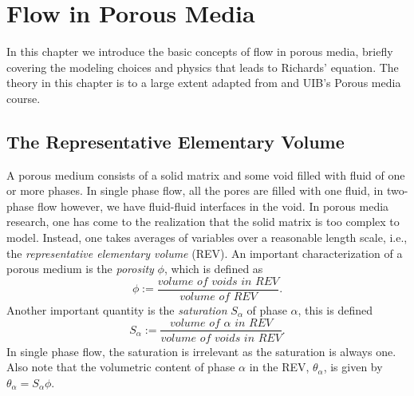 \documentclass[../Main/main.tex]{subfiles}
\begin{document}
\graphicspath{{../Flow in porous media/figs/}}
\chapter{Flow in Porous Media}
In this chapter we introduce the basic concepts of flow in porous media, briefly covering the modeling choices and physics that leads to Richards' equation. The theory in this chapter is to a large extent adapted from \cite{Nordbotten} and UIB's Porous media course.
\section{The Representative Elementary Volume}\label{REV}
A porous medium consists of a solid matrix and some void filled with fluid of one or more phases. In single phase flow, all the pores are filled with one fluid, in two-phase flow however, we have fluid-fluid interfaces in the void. In porous media research, one has come to the realization that the solid matrix is too complex to model. Instead, one takes averages of variables over a reasonable length scale, i.e., the \emph{representative elementary volume} (REV).
An important characterization of a porous medium is the \emph{porosity} $\phi$, which is defined as 
\begin{equation}
	\phi := \frac{\textit{volume of voids in REV}}{\textit{volume of REV}}.
\end{equation}
Another important quantity is the \emph{saturation} $S_{\alpha}$ of phase $\alpha$,  this is defined 
\begin{equation}
	S_{\alpha} := \frac{\textit{volume of }\alpha \textit{ in REV}}{\textit{volume of voids in REV}}.
\end{equation}
In single phase flow, the saturation is irrelevant as the saturation is always one. Also note that the volumetric content of phase $\alpha$ in the REV, $\theta_{\alpha}$, is given by $\theta_{\alpha} = S_{\alpha} \phi$.
\end{document}
